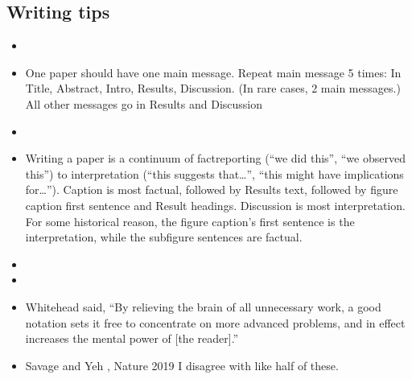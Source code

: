 \documentclass[letterpaper,10pt,english]{sphinxmanual}
\begin{document}
\subsection{Writing tips}
\label{\detokenize{PaperWritingTips:writing-tips}}\begin{itemize}
\item {} 
\sphinxAtStartPar
{}

\item {} 
\sphinxAtStartPar
One paper should have one main message. Repeat main message 5 times: In Title, Abstract, Intro, Results, Discussion. (In rare cases, 2 main messages.) All other messages go in Results and Discussion

\item {} 
\sphinxAtStartPar
{}

\item {} 
\sphinxAtStartPar
Writing a paper is a continuum of fact\sphinxhyphen{}reporting (“we did this”, “we observed this”) to interpretation (“this suggests that…”, “this might have implications for…”). Caption is most factual, followed by Results text, followed by figure caption first sentence and Result headings. Discussion is most interpretation. For some historical reason, the figure caption’s first sentence is the interpretation, while the subfigure sentences are factual.

\item {} 
\sphinxAtStartPar
{}

\item {} 
\sphinxAtStartPar
{}

\item {} 
\sphinxAtStartPar
Whitehead said, “By relieving the brain of all unnecessary work, a good notation sets it free to concentrate on more advanced problems, and in effect increases the mental power of {[}the reader{]}.”

\item {} 
\sphinxAtStartPar
Savage and Yeh , Nature 2019 I disagree with like half of these.


\end{itemize}
\end{document}
